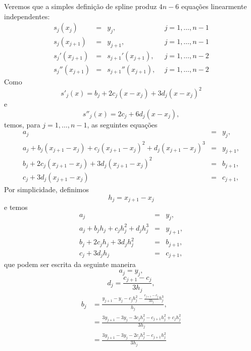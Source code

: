 Veremos que a simples definição de spline produz $4n-6$ equações linearmente independentes:
\begin{equation*}
\begin{array}{rcll}
s_j(x_j)&=&y_j,~~ &j=1,\ldots, n-1\\
s_{j}(x_{j+1})&=&y_{j+1},~~ &j=1,\ldots, n-1\\
s_{j}'(x_{j+1})&=&s_{j+1}'(x_{j+1}),~~ &j=1,\ldots, n-2\\
s_{j}''(x_{j+1})&=&s_{j+1}''(x_{j+1}),~~ &j=1,\ldots, n-2
\end{array}
\end{equation*}
Como
\begin{equation}\label{eq_1derivada}
s'_j(x)=b_j+2c_j(x-x_j)+3d_j(x-x_j)^2
\end{equation}
e
\begin{equation}\label{eq_2derivada}
s''_j(x)=2c_j+6d_j(x-x_j),
\end{equation}
temos, para $j=1,\ldots, n-1$, as seguintes equações
\begin{equation*}
\begin{array}{rcl}
a_j&=&y_j,\\
a_j+b_j(x_{j+1}-x_j)+c_j(x_{j+1}-x_j)^2+d_j(x_{j+1}-x_j)^3&=&y_{j+1},\\
b_j+2c_j(x_{j+1}-x_j)+3d_j(x_{j+1}-x_j)^2&=&b_{j+1},\\
c_j+3d_j(x_{j+1}-x_j)&=&c_{j+1},
\end{array}
\end{equation*}
Por simplicidade, definimos
$$
h_j=x_{j+1}-x_j
$$
e temos
\begin{equation}
\begin{array}{rcl}
a_j&=&y_j,\\
a_j+b_jh_j+c_jh_j^2+d_jh_j^3&=&y_{j+1},\\
b_j+2c_jh_j+3d_jh_j^2&=&b_{j+1},\label{eq3}\\
c_j+3d_jh_j&=&c_{j+1},
\end{array}
\end{equation}
que podem ser escrita da seguinte maneira
\begin{equation}\label{eq_an_spline}
a_j=y_j,
\end{equation}
\begin{equation}\label{eq_dn_spline}
d_j=\frac{c_{j+1}-c_j}{3h_j},
\end{equation}
\begin{equation}\label{eq_bn_spline}
  \begin{split}
    b_j &= \frac{y_{j+1}-y_j-c_jh_j^2-\frac{c_{j+1}-c_j}{3h_j}h_j^3}{h_j},\\
    &= \frac{3y_{j+1}-3y_j-3c_jh_j^2-c_{j+1}h_j^2+c_jh_j^2}{3h_j}\\
    &= \frac{3y_{j+1}-3y_j-2c_jh_j^2-c_{j+1}h_j^2}{3h_j}
  \end{split}
\end{equation}
